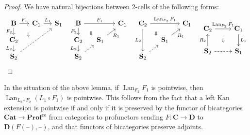 \documentclass[11pt, oneside, article]{memoir}
\theoremstyle{plain}
\theoremstyle{definition}
\theoremstyle{remark}
\newenvironment{remark}
{\renewcommand\qedsymbol{$\lrcorner$}%
  \pushQED{\qed}\myremark}
{\popQED\endmyremark}
\DeclareMathOperator{\Lan}{Lan}
\DeclareMathOperator{\cohelper}{co}
\newcommand{\dash}{{\mathord{\text{--}}}}
\newcommand{\co}{^{\cohelper}}
\newcommand{\namedcat}[1]{\mathbf{#1}}
\newcommand{\cat}[1]{\mathbf{#1}}
\newcommand{\Cat}{\namedcat{Cat}}
\newcommand{\Prof}{\namedcat{Prof}}
\newcommand{\Ho}[1]{#1}
\newcommand{\bB}{\cat{B}}
\newcommand{\bC}{\cat{C}}
\newcommand{\bD}{\cat{D}}
\newcommand{\bS}{\cat{S}}
\newcommand{\La}[2]{\Lan_{#1}#2}
\begin{document}
\begin{proof}
  We have natural bijections between 2-cells of the following forms:
  \[
    \begin{tikzcd}[row sep=small, column sep=small]
      {\bB} & {\bC_1} & {\bS_1} \\
      {\bC_2} \\
      {\bS_2}
      \arrow["{F_1}", from=1-1, to=1-2]
      \arrow["{F_2}"', from=1-1, to=2-1]
      \arrow["{L_1}", from=1-2, to=1-3]
      \arrow["{L_2}"', from=2-1, to=3-1]
      \arrow[""{name=0, anchor=center, inner sep=0}, dashed, from=3-1, to=1-3]
      \arrow["\Downarrow"{description, pos=0.55}, draw=none, from=1-1, to=0]
    \end{tikzcd}
    \;\;
    \begin{tikzcd}[row sep=small, column sep=small]
      {\bB} && {\bC_1} \\
      {\bC_2} & {\bS_1} \\
      {\bS_2}
      \arrow["{F_1}", from=1-1, to=1-3]
      \arrow["{F_2}"', from=1-1, to=2-1]
      \arrow["\Downarrow"{description, pos=0.75}, draw=none, from=1-1, to=2-2]
      \arrow["{L_2}"', from=2-1, to=3-1]
      \arrow["{R_1}"', from=2-2, to=1-3]
      \arrow[dashed, from=3-1, to=2-2]
    \end{tikzcd}
    \;\;
    \begin{tikzcd}[row sep=small, column sep=small]
      {\bC_2} && {\bC_1} \\
      & {\bS_1} \\
      {\bS_2}
      \arrow["{\La{F_2}{F_1}}", from=1-1, to=1-3]
      \arrow["\Downarrow"{description, pos=0.75}, draw=none, from=1-1, to=2-2]
      \arrow["{L_2}"', from=1-1, to=3-1]
      \arrow["{R_1}"', from=2-2, to=1-3]
      \arrow[dashed, from=3-1, to=2-2]
    \end{tikzcd}
    \;\;
    \begin{tikzcd}
      {\bC_2} & {\bC_1} \\
      {\bS_2} & {\bS_1}
      \arrow["{\La{F_2}{F_1}}", from=1-1, to=1-2]
      \arrow["\Downarrow"{description}, draw=none, from=1-1, to=2-2]
      \arrow["{L_1}", from=1-2, to=2-2]
      \arrow["{R_2}", from=2-1, to=1-1]
      \arrow[dashed, from=2-1, to=2-2]
    \end{tikzcd}
    \qedhere
  \]
\end{proof}

\begin{remark}\label{rem:composepointwise}
  In the situation of the above lemma, if $\La{F_2}{F_1}$ is
  pointwise, then $\La{L_2 \circ F_2}{(L_1 \circ F_1)}$ is pointwise.
  This follows from the fact that a left Kan extension is pointwise if and
  only if it is preserved by the functor of bicategories
  $\Cat \to \Prof\co$ from categories to profunctors sending
  $F\colon \bC \to \bD$ to $\Ho{\bD}(F(\dash), \dash)$, and that
  functors of bicategories preserve adjoints.
\end{remark}
\end{document}
